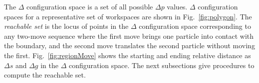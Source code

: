 The $\Delta$ configuration space is a set of all possible $\Delta p$ values.
 $\Delta$ configuration spaces for a representative set of workspaces are shown in Fig.~\ref{fig:polygon}. The \emph{reachable set} is the locus of points in the $\Delta$ configuration space corresponding to any two-move sequence where the first move brings one particle into contact with the boundary, and the second move translates the second particle without moving the first.
 Fig.~\ref{fig:regionMove} shows the starting and ending relative distance as $\Delta s$ and $\Delta g$ in the $\Delta$ configuration space. %
 The next subsections give procedures to compute the reachable set.
 
